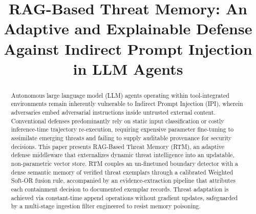 \documentclass[conference]{IEEEtran}
\begin{document}
\title{RAG-Based Threat Memory: An Adaptive and Explainable Defense Against Indirect Prompt Injection in LLM Agents}

\author{
}

\maketitle

\begin{abstract}
Autonomous large language model (LLM) agents operating within tool-integrated environments remain inherently vulnerable to Indirect Prompt Injection (IPI), wherein adversaries embed adversarial instructions inside untrusted external content. Conventional defenses predominantly rely on static input classification or costly inference-time trajectory re-execution, requiring expensive parameter fine-tuning to assimilate emerging threats and failing to supply auditable provenance for security decisions. This paper presents RAG-Based Threat Memory (RTM), an adaptive defense middleware that externalizes dynamic threat intelligence into an updatable, non-parametric vector store. RTM couples an un-finetuned boundary detector with a dense semantic memory of verified threat exemplars through a calibrated Weighted Soft-OR fusion rule, accompanied by an evidence-extraction pipeline that attributes each containment decision to documented exemplar records. Threat adaptation is achieved via constant-time append operations without gradient updates, safeguarded by a multi-stage ingestion filter engineered to resist memory poisoning.


\end{abstract}
\end{document}
